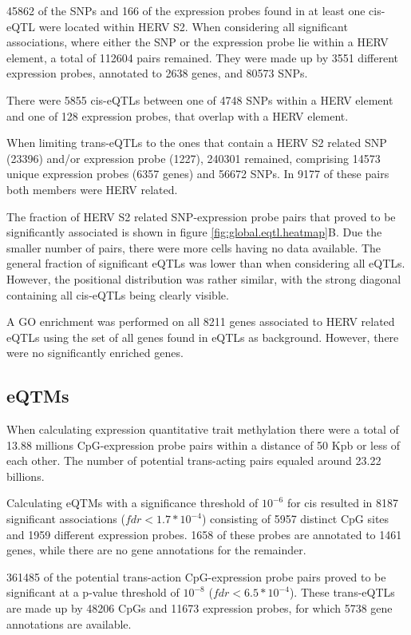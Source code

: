 \documentclass[a4paper,12pt,twoside,openright]{article}
\begin{document}
45862 of the SNPs and 166 of the expression probes found in at least one cis-eQTL were located within HERV S2. When considering all significant associations, where either the SNP or the expression probe lie within a HERV element, a total of 112604 pairs remained. They were made up by 3551 different expression probes, annotated to 2638 genes, and 80573 SNPs. 

There were 5855 cis-eQTLs between one of 4748 SNPs within a HERV element and one of 128 expression probes, that overlap with a HERV element. 

When limiting trans-eQTLs to the ones that contain a HERV S2 related SNP (23396) and/or expression probe (1227), 240301 remained, comprising 14573 unique expression probes (6357 genes) and 56672 SNPs. In 9177 of these pairs both members were HERV related. 

The fraction of HERV S2 related SNP-expression probe pairs that proved to be significantly associated is shown in figure \ref{fig:global.eqtl.heatmap}B. Due the smaller number of pairs, there were more cells having no data available. The general fraction of significant eQTLs was lower than when considering all eQTLs. However, the positional distribution was rather similar, with the strong diagonal containing all cis-eQTLs being clearly visible.  

A GO enrichment was performed on all 8211 genes associated to HERV related eQTLs using the set of all genes found in eQTLs as background. However, there were no significantly enriched genes. 

\subsection{eQTMs}
\label{Results:eQTMs}
When calculating expression quantitative trait methylation there were a total of 13.88 millions CpG-expression probe pairs within a distance of 50 Kpb or less of each other. The number of potential trans-acting pairs equaled around 23.22 billions. 

Calculating eQTMs with a significance threshold of $10^{-6}$ for cis resulted in 8187 significant associations ($fdr<1.7*10^{-4}$) consisting of 5957 distinct CpG sites and 1959 different expression probes. 1658 of these probes are annotated to 1461 genes, while there are no gene annotations for the remainder. 

361485 of the potential trans-action CpG-expression probe pairs proved to be significant at a p-value threshold of $10^{-8}$ ($fdr<6.5*10^{-4}$). These trans-eQTLs are made up by 48206 CpGs and 11673 expression probes, for which 5738 gene annotations are available. 
\end{document}
